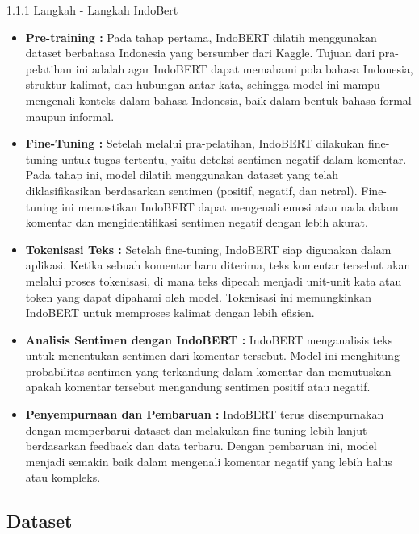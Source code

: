 \documentclass[journal,article,submit,pdftex,moreauthors]{Definitions/mdpi}
\begin{document}
\item \hspace{1cm} 1.1.1 Langkah - Langkah IndoBert
\begin{adjustwidth}{4em}{0pt} 
\begin{itemize}
    \item \textbf{Pre-training :} 
    Pada tahap pertama, IndoBERT dilatih menggunakan dataset berbahasa Indonesia yang bersumber dari Kaggle. Tujuan dari pra-pelatihan ini adalah agar IndoBERT dapat memahami pola bahasa Indonesia, struktur kalimat, dan hubungan antar kata, sehingga model ini mampu mengenali konteks dalam bahasa Indonesia, baik dalam bentuk bahasa formal maupun informal.
    \item \textbf{Fine-Tuning :} 
    Setelah melalui pra-pelatihan, IndoBERT dilakukan fine-tuning untuk tugas tertentu, yaitu deteksi sentimen negatif dalam komentar. Pada tahap ini, model dilatih menggunakan dataset yang telah diklasifikasikan berdasarkan sentimen (positif, negatif, dan netral). Fine-tuning ini memastikan IndoBERT dapat mengenali emosi atau nada dalam komentar dan mengidentifikasi sentimen negatif dengan lebih akurat.
    \item \textbf{Tokenisasi Teks :} 
    Setelah fine-tuning, IndoBERT siap digunakan dalam aplikasi. Ketika sebuah komentar baru diterima, teks komentar tersebut akan melalui proses tokenisasi, di mana teks dipecah menjadi unit-unit kata atau token yang dapat dipahami oleh model. Tokenisasi ini memungkinkan IndoBERT untuk memproses kalimat dengan lebih efisien.
    \item \textbf{Analisis Sentimen dengan IndoBERT :} 
    IndoBERT menganalisis teks untuk menentukan sentimen dari komentar tersebut. Model ini menghitung probabilitas sentimen yang terkandung dalam komentar dan memutuskan apakah komentar tersebut mengandung sentimen positif atau negatif.
    \item \textbf{Penyempurnaan dan Pembaruan :} 
    IndoBERT terus disempurnakan dengan memperbarui dataset dan melakukan fine-tuning lebih lanjut berdasarkan feedback dan data terbaru. Dengan pembaruan ini, model menjadi semakin baik dalam mengenali komentar negatif yang lebih halus atau kompleks.

\end{itemize}
\end{adjustwidth}

\subsection{Dataset}
\end{document}
